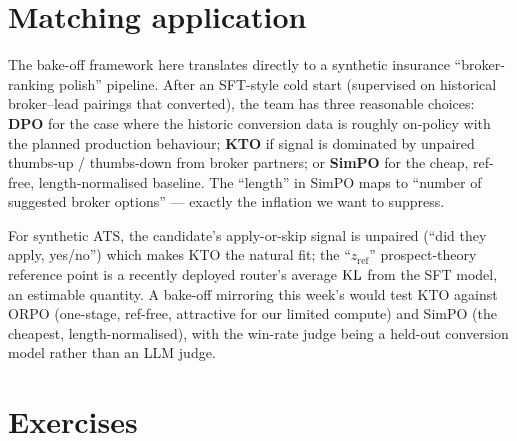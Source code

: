 \documentclass[11pt,oneside]{scrbook}
\begin{document}
\chapter{Matching application}

\begin{matching}
The bake-off framework here translates directly to a synthetic insurance
``broker-ranking polish'' pipeline. After an SFT-style cold start
(supervised on historical broker--lead pairings that converted), the
team has three reasonable choices: \textbf{DPO} for the case where
the historic conversion data is roughly on-policy with the planned
production behaviour; \textbf{KTO} if signal is dominated by
unpaired thumbs-up / thumbs-down from broker partners; or
\textbf{SimPO} for the cheap, ref-free, length-normalised baseline.
The ``length'' in SimPO maps to ``number of suggested broker
options'' --- exactly the inflation we want to suppress.

For synthetic ATS, the candidate's apply-or-skip signal is unpaired
(``did they apply, yes/no'') which makes KTO the natural fit; the
``$z_{\text{ref}}$'' prospect-theory reference point is a recently
deployed router's average $\mathrm{KL}$ from the SFT model, an estimable
quantity. A bake-off mirroring this week's would test KTO against
ORPO (one-stage, ref-free, attractive for our limited compute) and
SimPO (the cheapest, length-normalised), with the win-rate judge
being a held-out conversion model rather than an LLM judge.
\end{matching}

\chapter{Exercises}
\end{document}
